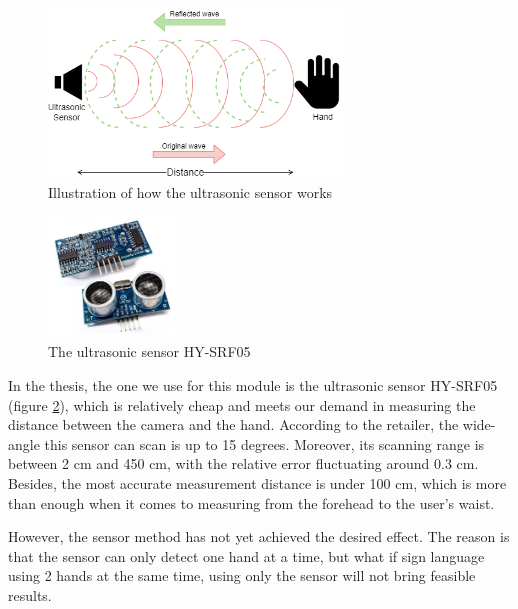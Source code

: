\begin{figure}[H]
	\centering
	\includegraphics[width=0.7\textwidth]{img/Chap4/UltrasonicSensorFunction.png}
	\caption{Illustration of how the ultrasonic sensor works}
	\label{fig:Chap4-UltrasonicSensorFunction}
\end{figure}

\begin{figure}
  \begin{center}
  	\includegraphics[width=0.3\textwidth]{img/Chap4/UltrasonicSensor.jpeg}
  \end{center}
	\caption{The ultrasonic sensor HY-SRF05}
  \label{fig:Chap4-UltrasonicSensorHYSRF05}
\end{figure}

In the thesis, the one we use for this module is the ultrasonic sensor HY-SRF05 (figure \ref{fig:Chap4-UltrasonicSensorHYSRF05}), which is relatively cheap and meets our demand in measuring the distance between the camera and the hand. According to the retailer, the wide-angle this sensor can scan is up to 15 degrees. Moreover, its scanning range is between 2 cm and 450 cm, with the relative error fluctuating around 0.3 cm. Besides, the most accurate measurement distance is under 100 cm, which is more than enough when it comes to measuring from the forehead to the user's waist.

However, the sensor method has not yet achieved the desired effect. The reason is that the sensor can only detect one hand at a time, but what if sign language using 2 hands at the same time, using only the sensor will not bring feasible results.

